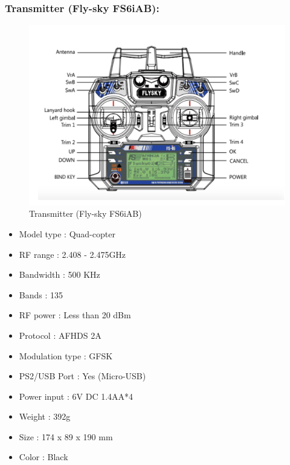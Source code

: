 \subsubsection{Transmitter (Fly-sky FS6iAB):}
\begin{figure}[h!]
\centering
\includegraphics[width=\columnwidth]{./Figures/transmitter_qc.png}
\caption{Transmitter (Fly-sky FS6iAB)}
\label{transmitter_qc}
\end{figure}

\begin{itemize}
    \item Model type 		: Quad-copter
    \item  RF range 		: 2.408 - 2.475GHz
    \item Bandwidth 		: 500 KHz
    \item Bands 		             : 135
    \item RF power 		: Less than 20 dBm
    \item Protocol 		: AFHDS 2A
    \item Modulation type 	: GFSK
    \item PS2/USB Port 		: Yes (Micro-USB)
    \item Power input 		: 6V DC 1.4AA*4
    \item Weight		             : 392g
    \item Size 			: 174 x 89 x 190 mm
    \item Color 			: Black 
\end{itemize}

